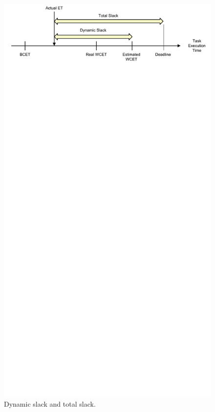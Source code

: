 \begin{figure}
  \begin{center}
    \includegraphics{monitoring_hard_drop/figs/slack_defn.pdf}
    \caption{Dynamic slack and total slack.}
    \label{fig:monitoring_hard_drop.drop.slack_defn} 
  \end{center}
\end{figure}

